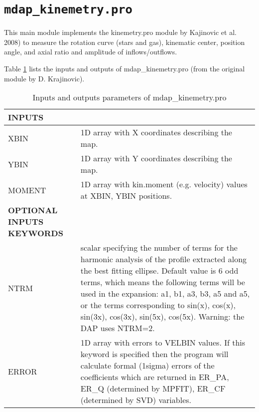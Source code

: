 \section{{\tt mdap\_kinemetry.pro}}
\label{dap_sec:mdap_kinemetry}

This main module implements the kinemetry.pro module by Kajinovic et
al. 2008) to measure the rotation curve (stars and gas), kinematic
center, position angle, and axial ratio and amplitude of
inflows/outflows.

Table \ref{dap_tab:mdap_kinemetry} lists the inputs and outputs of
mdap\_kinemetry.pro (from the original module by D. Krajinovic).


\begin{center}
\begin{longtable}{p{2.7cm}| p{11.1cm}}
\caption{Inputs and outputs parameters of
  mdap\_kinemetry.pro} \label{dap_tab:mdap_kinemetry}
\\ \hline \endfirsthead

\hline
\endhead

\hline
\endlastfoot

\hline
{\bf  INPUTS} &  \\
\hline
%
XBIN   & 1D array with X coordinates describing the map.\\
%
YBIN  & 1D array with Y coordinates describing the map.\\
%
MOMENT & 1D array with kin.moment (e.g. velocity) values  at XBIN, YBIN positions.\\
%
\hline
{\bf  OPTIONAL INPUTS KEYWORDS  } &  \\
\hline
NTRM  & scalar specifying the number of terms for the harmonic analysis 
	           of the profile extracted along the best fitting ellipse. Default
	           value is 6 odd terms, which means the following terms will be 
	           used in the expansion: a1, b1, a3, b3, a5 and a5, or the terms
                   corresponding to sin(x), cos(x), sin(3x), cos(3x), sin(5x), cos(5x).
                    Warning: the DAP uses NTRM=2.\\
%
ERROR & 1D array with errors to VELBIN values. If this
             keyword is specified then the program will calculate
	           formal (1sigma) errors of the coefficients which are
	           returned in ER\_PA, ER\_Q (determined by MPFIT), ER\_CF 
	           (determined by SVD) variables. 


\end{longtable}
\end{center}
